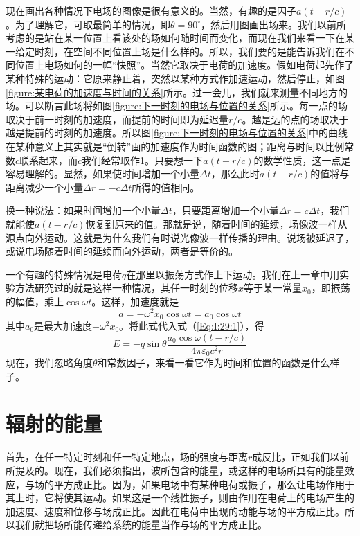 现在画出各种情况下电场的图像是很有意义的。当然，有趣的是因子$a(t-r/c)$。为了理解它，可取最简单的情况，即$\theta=90^\circ$，然后用图画出场来。我们以前所考虑的是站在某一位置上看该处的场如何随时间而变化，而现在我们来看一下在某一给定时刻，在空间不同位置上场是什么样的。所以，我们要的是能告诉我们在不同位置上电场如何的一幅“快照”。当然它取决于电荷的加速度。假如电荷起先作了某种特殊的运动：它原来静止着，突然以某种方式作加速运动，然后停止，如图\ref{figure:某电荷的加速度与时间的关系}所示。过一会儿，我们就来测量不同地方的场。可以断言此场将如图\ref{figure:下一时刻的电场与位置的关系}所示。每一点的场取决于前一时刻的加速度，而提前的时间即为延迟量$r/c$。越是远的点的场取决于越是提前的时刻的加速度。所以图\ref{figure:下一时刻的电场与位置的关系}中的曲线在某种意义上其实就是“倒转”画的加速度作为时间函数的图；距离与时间以比例常数$c$联系起来，而$c$我们经常取作1。只要想一下$a(t-r/c)$的数学性质，这一点是容易理解的。显然，如果使时间增加一个小量$\Delta t$，那么此时$a(t-r/c)$的值将与距离减少一个小量$\Delta r=-c\Delta t$所得的值相同。

换一种说法：如果时间增加一个小量$\Delta t$，只要距离增加一个小量$\Delta r=c\Delta t$，我们就能使$a(t-r/c)$恢复到原来的值。那就是说，随着时间的延续，场像波一样从源点向外运动。这就是为什么我们有时说光像波一样传播的理由。说场被延迟了，或说电场随着时间的延续而向外运动，两者是等价的。

一个有趣的特殊情况是电荷$q$在那里以振荡方式作上下运动。我们在上一章中用实验方法研究过的就是这样一种情况，其任一时刻的位移$x$等于某一常量$x_0$，即振荡的幅值，乘上$\cos\omega t$。这样，加速度就是
\begin{equation}
    \label{Eq:I:29:2}
    a=-\omega^2x_0\cos\omega t = a_0\cos\omega t
\end{equation}
其中$a_0$是最大加速度$-\omega^2x_0$。将此式代入式（\ref{Eq:I:29:1}），得
\begin{equation}
    \label{Eq:I:29:3}
    E=-q\sin\theta\frac{a_0\cos\omega(t-r/c)}{4\pi\varepsilon_0c^2r}
\end{equation}
现在，我们忽略角度$\theta$和常数因子，来看一看它作为时间和位置的函数是什么样子。

\section{辐射的能量}

首先，在任一特定时刻和任一特定地点，场的强度与距离$r$成反比，正如我们以前所提及的。现在，我们必须指出，波所包含的能量，或这样的电场所具有的能量效应，与场的平方成正比。因为，如果电场中有某种电荷或振子，那么让电场作用于其上时，它将使其运动。如果这是一个线性振子，则由作用在电荷上的电场产生的加速度、速度和位移与场成正比。因此在电荷中出现的动能与场的平方成正比。所以我们就把场所能传递给系统的能量当作与场的平方成正比。

